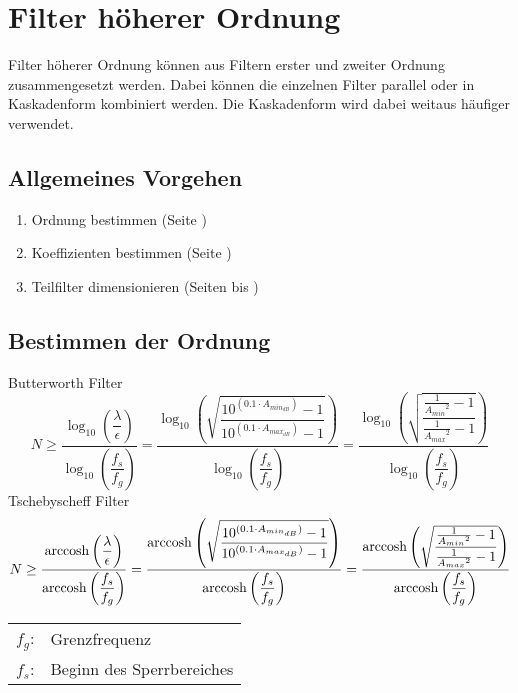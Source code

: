 



\section{Filter höherer Ordnung}
Filter höherer Ordnung können aus Filtern erster und zweiter Ordnung 
zusammengesetzt werden. Dabei können die einzelnen Filter parallel oder in 
Kaskadenform kombiniert werden. Die Kaskadenform wird dabei weitaus häufiger 
verwendet. 

\subsection{Allgemeines Vorgehen}
\begin{enumerate}
  \item Ordnung bestimmen 
        (Seite \pageref{filt:ord})
  \item Koeffizienten bestimmen 
        (Seite \pageref{filt:koeff})
  \item Teilfilter dimensionieren 
        (Seiten \pageref{filt:o1-tp} bis  \pageref{filt:o2-bp})
\end{enumerate}

\subsection{Bestimmen der Ordnung}
\label{filt:ord}
Butterworth Filter
\[ N \geq \frac{\log_{10}\left(\dfrac{\lambda}{\epsilon}\right)}
{\log_{10}\left(\dfrac{f_s}{f_g}\right)} 
= \frac{\log_{10}\left(\sqrt{\dfrac{10^{(0.1 \cdot A_{min_{dB}})} - 1}
{10^{(0.1 \cdot A_{max_{dB}})} - 1}}\right)}
{\log_{10}\left(\dfrac{f_s}{f_g}\right)} 
= \frac{\log_{10}\left(\sqrt{\dfrac{\frac{1}{{A_{min}}^2} - 1}
{\frac{1}{{A_{max}}^2} - 1}}\right)}
{\log_{10}\left(\dfrac{f_s}{f_g}\right)} \]
Tschebyscheff Filter
\[ N \geq \frac{\operatorname{arccosh}\left(\dfrac{\lambda}{\epsilon}\right)}
{\operatorname{arccosh}\left(\dfrac{f_s}{f_g}\right)} 
= \frac{\operatorname{arccosh}\left(\sqrt{\dfrac{10^{(0.1 \cdot A_{min_{dB}})} - 1}
{10^{(0.1 \cdot A_{max_{dB}})} - 1}}\right)}
{\operatorname{arccosh}\left(\dfrac{f_s}{f_g}\right)} 
= \frac{\operatorname{arccosh}\left(\sqrt{\dfrac{\frac{1}{{A_{min}}^2} - 1}
{\frac{1}{{A_{max}}^2} - 1}}\right)}
{\operatorname{arccosh}\left(\dfrac{f_s}{f_g}\right)} \]
\begin{tabular}{ll}
$f_g$: & Grenzfrequenz \\
$f_s$: & Beginn des Sperrbereiches
\end{tabular}

